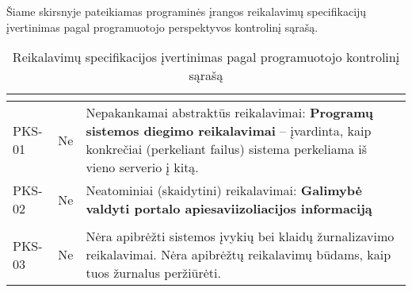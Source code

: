 \documentclass{VUMIFPSkursinis}
\begin{document}
Šiame skirsnyje pateikiamas programinės įrangos reikalavimų specifikacijų įvertinimas pagal programuotojo perspektyvos kontrolinį sąrašą.
\begin{center}

	\begin{longtable}{|C{2cm}|L{2.5cm}|L{10cm}|}

		\caption{Reikalavimų specifikacijos įvertinimas pagal programuotojo kontrolinį sąrašą}
		\label{table:PKS-2}

		\\ \hline
		 &
		 &
		\\ \hline
		PKS-01                                          &
		Ne                                              &
		Nepakankamai abstraktūs reikalavimai: \textbf{Programų sistemos diegimo reikalavimai} -- įvardinta, kaip konkrečiai (perkeliant failus) sistema perkeliama iš vieno serverio į kitą.                                                                               \\ \hline
		PKS-02                                          &
		Ne                                              &
		Neatominiai (skaidytini) reikalavimai: \textbf{Galimybė valdyti portalo apiesaviizoliacijos informaciją}                                                                                                                                                                                                                            \\ \hline                                                                                                                                                                                                                                           \\ \hline
		PKS-03                                          &
		Ne                                              &
		Nėra apibrėžti sistemos įvykių bei klaidų žurnalizavimo reikalavimai. Nėra apibrėžtų reikalavimų būdams, kaip tuos žurnalus peržiūrėti.                                                                                                                            \\ \hline

\end{longtable}
\end{center}
\end{document}
